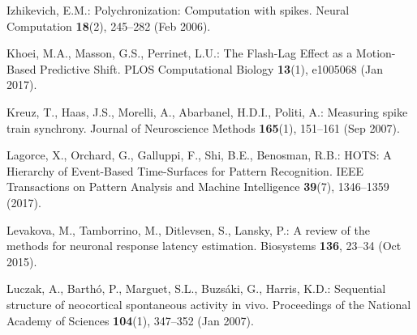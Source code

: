 \documentclass[runningheads]{llncs}
\begin{document}
\begin{thebibliography}{10}
  Izhikevich, E.M.: Polychronization: {Computation} with spikes. Neural Computation  \textbf{18}(2),  245--282 (Feb 2006). %
  
  Khoei, M.A., Masson, G.S., Perrinet, L.U.: The {Flash}-{Lag} {Effect} as a {Motion}-{Based} {Predictive} {Shift}. PLOS Computational Biology  \textbf{13}(1),  e1005068 (Jan 2017). %
  
  Kreuz, T., Haas, J.S., Morelli, A., Abarbanel, H.D.I., Politi, A.: Measuring spike train synchrony. Journal of Neuroscience Methods  \textbf{165}(1),  151--161 (Sep 2007). 
  
  Lagorce, X., Orchard, G., Galluppi, F., Shi, B.E., Benosman, R.B.: {HOTS}: {A} {Hierarchy} of {Event}-{Based} {Time}-{Surfaces} for {Pattern} {Recognition}. IEEE Transactions on Pattern Analysis and Machine Intelligence  \textbf{39}(7),  1346--1359 (2017). %
  
  Levakova, M., Tamborrino, M., Ditlevsen, S., Lansky, P.: A review of the methods for neuronal response latency estimation. Biosystems  \textbf{136},  23--34 (Oct 2015). %
  
  Luczak, A., Barthó, P., Marguet, S.L., Buzsáki, G., Harris, K.D.: Sequential structure of neocortical spontaneous activity in vivo. Proceedings of the National Academy of Sciences  \textbf{104}(1),  347--352 (Jan 2007). %
  

\end{thebibliography}
\end{document}
